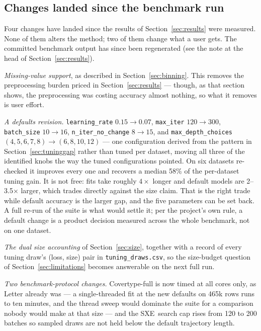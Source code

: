 \documentclass[11pt,a4paper]{article}
\newcommand{\code}[1]{\texttt{\small #1}}
\newcommand{\SXE}{\textsc{SXE}}
\theoremstyle{definition}
\begin{document}
\subsection{Changes landed since the benchmark run}\label{sec:inflight}

Four changes have landed since the results of Section~\ref{sec:results} were
measured. None of them alters the method; two of them change what a user gets.
The committed benchmark output has since been regenerated (see the note at the
head of Section~\ref{sec:results}).

\emph{Missing-value support}, as described in Section~\ref{sec:binning}. This
removes the preprocessing burden priced in Section~\ref{sec:results} ---
though, as that section shows, the preprocessing was costing accuracy almost
nothing, so what it removes is user effort.

\emph{A defaults revision.} \code{learning\_rate} $0.15 \to 0.07$,
\code{max\_iter} $120 \to 300$, \code{batch\_size} $10 \to 16$,
\code{n\_iter\_no\_change} $8 \to 15$, and \code{max\_depth\_choices}
$(4,5,6,7,8) \to (6,8,10,12)$ --- one configuration derived from the pattern in
Section~\ref{sec:tuninggap} rather than tuned per dataset, moving all three of
the identified knobs the way the tuned configurations pointed. On six datasets
re-checked it improves every one and recovers a median 58\% of the per-dataset
tuning gain. It is not free: fits take roughly $4\times$ longer and default
models are 2--3.5$\times$ larger, which trades directly against the size claim.
That is the right trade while default accuracy is the larger gap, and the five
parameters can be set back. A full re-run of the suite is what would settle it;
per the project's own rule, a default change is a product decision measured
across the whole benchmark, not on one dataset.

\emph{The dual size accounting} of Section~\ref{sec:size}, together with a
record of every tuning draw's (loss, size) pair in \code{tuning\_draws.csv}, so
the size-budget question of Section~\ref{sec:limitations} becomes answerable on
the next full run.

\emph{Two benchmark-protocol changes.} Covertype-full is now timed at all cores
only, as Letter already was --- a single-threaded fit at the new defaults on
465k rows runs to ten minutes, and the thread sweep would dominate the suite for
a comparison nobody would make at that size --- and the \SXE\ search cap rises
from 120 to 200 batches so sampled draws are not held below the default
trajectory length.
\end{document}

